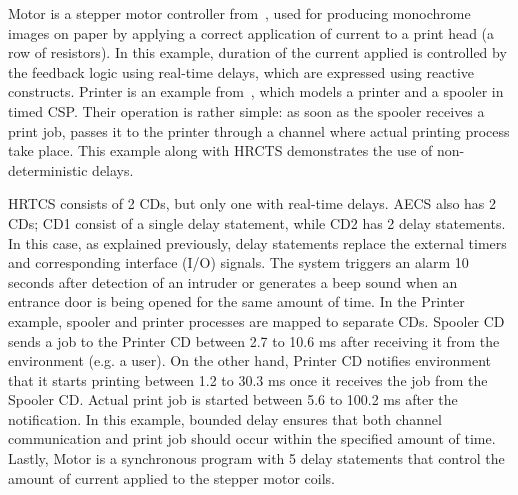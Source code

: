Motor is a stepper motor controller from~\cite{Bourke2009a}, used for
producing monochrome images on paper by applying a correct application
of current to a print head (a row of resistors). In this example,
duration of the current applied is controlled by the feedback logic
using real-time delays, which are expressed using reactive
constructs. Printer is an example from~\cite{Schneider:1999:CRT:555233},
which models a printer and a spooler in timed CSP.  Their operation is
rather simple: as soon as the spooler receives a print job, passes it to
the printer through a channel where actual printing process take
place. This example along with HRCTS demonstrates the use of
non-deterministic delays.


HRTCS consists of 2 CDs, but only one with real-time delays. AECS also
has 2 CDs; CD1 consist of a single delay statement, while CD2 has 2
delay statements. In this case, as explained previously, delay
statements replace the external timers and corresponding interface (I/O)
signals. The system triggers an alarm 10 seconds after detection of an
intruder or generates a beep sound when an entrance door is being opened
for the same amount of time. In the Printer example, spooler and printer
processes are mapped to separate CDs. Spooler CD sends a job to the
Printer CD between 2.7 to 10.6 ms after receiving it from the
environment (e.g. a user). On the other hand, Printer CD notifies
environment that it starts printing between 1.2 to 30.3 ms once it
receives the job from the Spooler CD. Actual print job is started
between 5.6 to 100.2 ms after the notification. In this example, bounded
delay ensures that both channel communication and print job should occur
within the specified amount of time. Lastly, Motor is a synchronous
program with 5 delay statements that control the amount of current
applied to the stepper motor coils.




